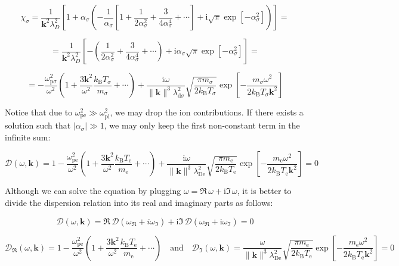 \begin{equation}
    \chi_\sigma=\frac{1}{\mathbf{k}^2\lambda_D^2}\left[1+\alpha_\sigma\left(-\frac{1}{\alpha_\sigma}\left[1+\frac{1}{2\alpha_\sigma^2}+\frac{3}{4\alpha_\sigma^4}+\cdots\right]+\mathrm{i}\sqrt{\pi}\exp{[-\alpha_\sigma^2]}\right)\right]=
\end{equation}

\begin{equation}
    =\frac{1}{\mathbf{k}^2\lambda_D^2}\left[-\left(\frac{1}{2\alpha_\sigma^2}+\frac{3}{4\alpha_\sigma^4}+\cdots\right)+\mathrm{i}\alpha_\sigma\sqrt{\pi}\exp{[-\alpha_\sigma^2]}\right]=
\end{equation}

\begin{equation}
    =-\frac{\omega_{\mathrm{p}\sigma}^2}{\omega^2}\left(1+\frac{3\mathbf{k}^2}{\omega^2}\frac{k_\mathrm{B}T_\sigma}{m_\sigma}+\cdots\right)+\frac{\mathrm{i}\omega}{\|\mathbf{k}\|^3\lambda_{\mathrm{d}\sigma}^2}\sqrt{\frac{\pi m_\sigma}{2k_\mathrm{B}T_\sigma}}\exp{\left[-\frac{m_\sigma\omega^2}{2k_\mathrm{B}T_\sigma\mathbf{k}^2}\right]}
\end{equation}


Notice that due to $\omega_{\text{pe}}^2\gg\omega_{\text{pi}}^2$, we may drop the ion contributions. If there exists a solution such that $|\alpha_\sigma|\gg1$, we may only keep the first non-constant term in the infinite sum:

\begin{equation}
    \mathcal{D}(\omega,\mathbf{k})=1-\frac{\omega_\text{pe}^2}{\omega^2}\left(1+\frac{3\mathbf{k}^2}{\omega^2}\frac{k_\mathrm{B}T_\text{e}}{m_\text{e}}+\cdots\right)+\frac{\mathrm{i}\omega}{\|\mathbf{k}\|^3\lambda_{\text{De}}^2}\sqrt{\frac{\pi m_\text{e}}{2k_\mathrm{B}T_\text{e}}}\exp{\left[-\frac{m_\text{e}\omega^2}{2k_\mathrm{B}T_\text{e}\mathbf{k}^2}\right]}=0
\end{equation}

Although we can solve the equation by plugging $\omega=\Re\,\omega+\mathrm{i}\Im\,\omega$, it is better to divide the dispersion relation into its real and imaginary parts as follows:

\begin{equation}
	\mathcal{D}(\omega,\mathbf{k})=\Re\,\mathcal{D}(\omega_{\Re}{}+i\omega_{\Im})+\mathrm{i}\Im\,\mathcal{D}(\omega_{\Re}{}+\mathrm{i}\omega_{\Im})=0
\end{equation}

\begin{equation}
    \mathcal{D}_{\Re}(\omega,\mathbf{k})=1-\frac{\omega_\text{pe}^2}{\omega^2}\left(1+\frac{3\mathbf{k}^2}{\omega^2}\frac{k_\mathrm{B}T_\text{e}}{m_\text{e}}+\cdots\right)\quad\text{and}\quad \mathcal{D}_{\Im}(\omega,\mathbf{k})=\frac{\omega}{\|\mathbf{k}\|^3\lambda_{\text{De}}^2}\sqrt{\frac{\pi m_\text{e}}{2k_\mathrm{B}T_\text{e}}}\exp{\left[-\frac{m_\text{e}\omega^2}{2k_\mathrm{B}T_\text{e}\mathbf{k}^2}\right]}=0
\end{equation}

